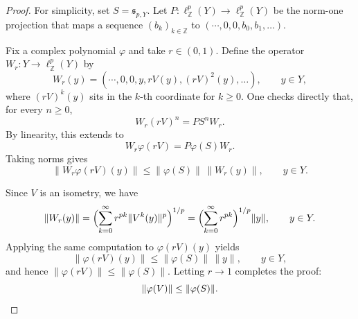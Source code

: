 \documentclass[12pt]{amsart}
\theoremstyle{remark}
\theoremstyle{definition}
\numberwithin{equation}{section}
\begin{document}
\begin{proof}
For simplicity, set $S = {\mathfrak s}_{p,Y}$. 
Let $P\colon \ell^p_{\mathbb Z}(Y) \to \ell^p_{\mathbb Z}(Y)$ 
be the norm-one projection that maps a sequence $(b_k)_{k\in\mathbb Z}$ to
$(\cdots, 0, 0, b_0, b_1, \ldots)$.

Fix a complex polynomial $\varphi$ and take $r\in(0,1)$. Define the operator $W_r\colon Y \to \ell^p_{\mathbb Z}(Y)$ by
$$
W_r(y) = (\cdots, 0, 0, y, rV(y), (rV)^2(y), \ldots), \qquad y \in Y,
$$
where $(rV)^k(y)$ sits in the $k$-th coordinate for $k\ge 0$. One checks directly that, for every $n\ge 0$,
$$
W_r (rV)^n = P S^n W_r.
$$
By linearity, this extends to
$$
W_r \varphi(rV) = P \varphi(S) W_r.
$$
Taking norms gives
$$
\|W_r \varphi(rV)(y)\| \le \|\varphi(S)\| \, \|W_r(y)\|, \qquad y \in Y.
$$

Since $V$ is an isometry, we have
$$
\|W_r(y)\| = \Bigl(\sum_{k=0}^\infty r^{pk} \|V^k(y)\|^p\Bigr)^{1/p}
= \Bigl(\sum_{k=0}^\infty r^{pk}\Bigr)^{1/p} \|y\|, \qquad y \in Y.
$$
Applying the same computation to $\varphi(rV)(y)$ yields
$$
\|\varphi(rV)(y)\| \le \|\varphi(S)\| \, \|y\|, \qquad y \in Y,
$$
and hence $\|\varphi(rV)\| \le \|\varphi(S)\|$. Letting $r \to 1$ completes the proof:
$$
\|\varphi(V)\| \le \|\varphi(S)\|.
\qedhere$$
\end{proof}
\end{document}
